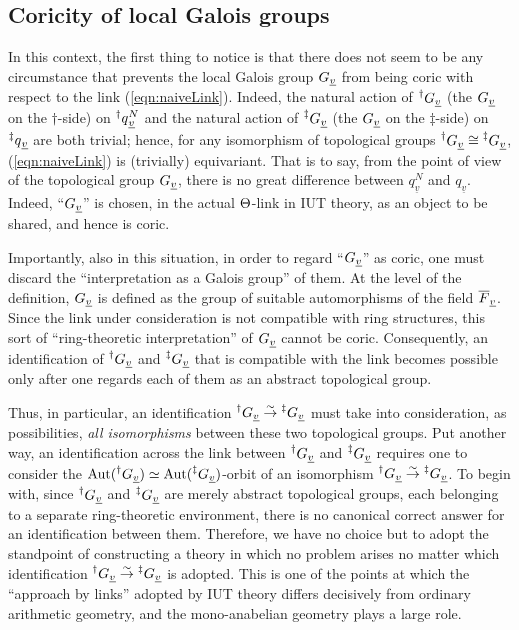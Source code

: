 \documentclass[12pt, reqno, a4paper]{amsart}
\def\udl#1{\underline{#1}} %
\def\simto{\stackrel{\sim}{\rightarrow}} %
\def\uv{\udl{v}} %
\DeclareMathOperator{\Aut}{Aut}
\begin{document}
\subsection{Coricity of local Galois groups}\label{sub:localGaloisGroup}
In this context, the first thing to notice is that there does not seem to be any circumstance that prevents the local Galois group $\GG_{\uv}$ from being coric with respect to the link (\ref{eqn:naiveLink}).
Indeed, the natural action of $\GG[\dag]_{\uv}$ (the $\GG_{\uv}$ on the $\dag$-side) on $\qq[\dag]_{\uv}^N$ and the natural action of $\GG[\ddag]_{\uv}$ (the $\GG_{\uv}$ on the $\ddag$-side) on $\qq[\ddag]_{\uv}$ are both trivial; hence, for any isomorphism of topological groups $\GG[\dag]_{\uv}\cong\GG[\ddag]_{\uv}$, (\ref{eqn:naiveLink}) is (trivially) equivariant.
That is to say, from the point of view of the topological group $\GG_{\uv}$, there is no great difference between $q_{\uv}^N$ and $q_{\uv}$.
Indeed, ``$\GG_{\uv}$'' is chosen, in the actual $\Th$-link in IUT theory, as an object to be shared, and hence is coric.

Importantly, also in this situation, in order to regard ``$\GG_{\uv}$'' as coric, one must discard the ``interpretation as a Galois group'' of them.
At the level of the definition, $\GG_{\uv}$ is defined as the group of suitable automorphisms of the field $\oF_{\uv}$.
Since the link under consideration is not compatible with ring structures, this sort of ``ring-theoretic interpretation'' of $\GG_{\uv}$ cannot be coric.
Consequently, an identification of $\GG[\dag]_{\uv}$ and $\GG[\ddag]_{\uv}$ that is compatible with the link becomes possible only after one regards each of them as an abstract topological group.

Thus, in particular, an identification $\GG[\dag]_{\uv}\simto\GG[\ddag]_{\uv}$ must take into consideration, as possibilities, {\it all isomorphisms} between these two topological groups.
Put another way, an identification across the link between $\GG[\dag]_{\uv}$ and $\GG[\ddag]_{\uv}$ requires one to consider the $\Aut(\GG[\dag]_{\uv}) \simeq \Aut(\GG[\ddag]_{\uv})$-orbit of an isomorphism $\GG[\dag]_{\uv}\simto\GG[\ddag]_{\uv}$.
To begin with, since $\GG[\dag]_{\uv}$ and $\GG[\ddag]_{\uv}$ are merely abstract topological groups, each belonging to a separate ring-theoretic environment, there is no canonical correct answer for an identification between them.
Therefore, we have no choice but to adopt the standpoint of constructing a theory in which no problem arises no matter which identification $\GG[\dag]_{\uv}\simto\GG[\ddag]_{\uv}$ is adopted.
This is one of the points at which the ``approach by links'' adopted by IUT theory differs decisively from ordinary arithmetic geometry, and the mono-anabelian geometry plays a large role.
\end{document}
